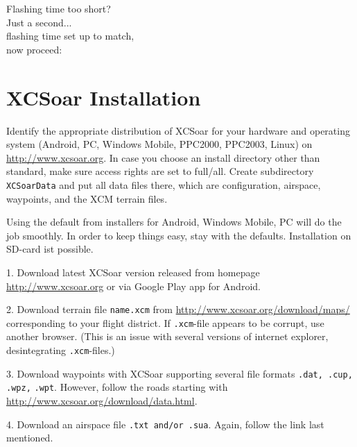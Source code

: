\documentclass[english,a4paper,12pt,utf8]{scrreprt}
\begin{document}
\hspace*{1cm} Flashing time too short?\\
\hspace*{4cm} Just a second...\\
\hspace*{6cm} flashing time set up to match,\\
\hspace*{10cm} now proceed:

\setlength{\parskip}{0.3\baselineskip}
\newpage
{}
\pagestyle{fancy}
\section{XCSoar Installation}\label{ch:XCSinstall}
Identify the appropriate distribution of XCSoar for your hardware and 
operating system \textsf{(Android, PC, Windows Mobile, PPC2000, PPC2003, Linux)} 
on \url{http://www.xcsoar.org}.
In case you choose an install directory other than standard, make sure access 
rights are set to full/all. Create subdirectory \verb+XCSoarData+ and put all 
data files there, which are configuration, airspace, waypoints, and the XCM 
terrain files.

Using the default from installers for Android, Windows Mobile, PC will do the 
job smoothly.  In order to keep things easy, stay with the defaults. 
Installation on SD-card ist possible.

\begin{compactitem}
\item[1.] Download latest XCSoar version released from homepage 
{\url{http://www.xcsoar.org}} or via Google Play app for Android.
\item[2.] Download terrain file \verb+name.xcm+ from 
{\url{http://www.xcsoar.org/download/maps/}}
corresponding to your flight district.  If \verb+.xcm+-file appears to be 
corrupt, use another browser. (This is an issue with several versions of 
internet explorer, desintegrating \verb+.xcm+-files.)
\item[3.] Download waypoints with XCSoar supporting several file formats 
\verb+.dat, .cup, .wpz,+ \verb+.wpt+.  However, follow the roads starting with 
{\url{http://www.xcsoar.org/download/data.html}}.
\item[4.] Download an airspace file \verb+.txt and/or .sua+.  Again, follow 
the link last mentioned.
\end{compactitem}
\end{document}
